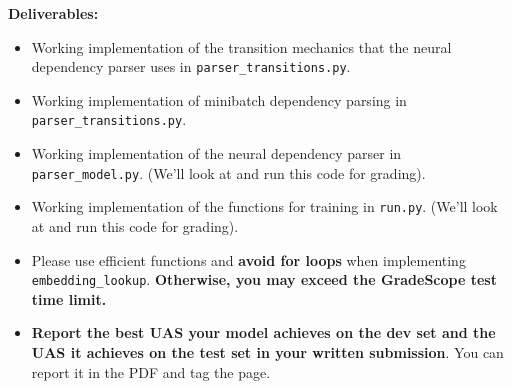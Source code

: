 \begin{parts}
\begin{enumerate}[label=\roman*.]
    \textbf{Deliverables:}
        \begin{itemize}
            \item Working implementation of the transition mechanics that the neural dependency parser uses in \texttt{parser\_transitions.py}. 
            \item Working implementation of minibatch dependency parsing in \texttt{parser\_transitions.py}.
            \item Working implementation of the neural dependency parser in \texttt{parser\_model.py}. (We'll look at and run this code for grading).
            \item Working implementation of the functions for training in \texttt{run.py}. (We'll look at and run this code for grading).
            \item Please use efficient functions and \textbf{avoid for loops} when implementing \texttt{embedding\_lookup}. \textbf{Otherwise, you may exceed the GradeScope test time limit.}
            \item \textbf{Report the best UAS your model achieves on the dev set and the UAS it achieves on the test set in your written submission}. You can report it in the PDF and tag the page.
    \end{itemize}
    \end{enumerate}
    
\end{parts}
